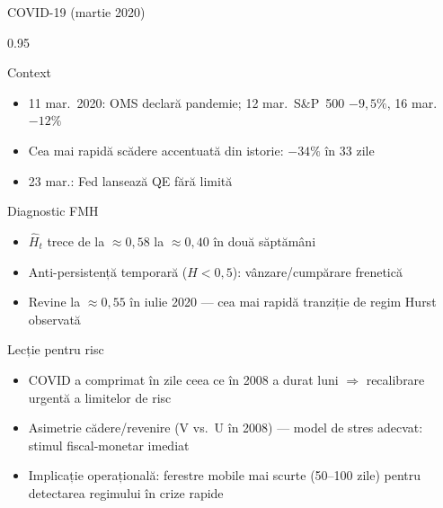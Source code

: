 \documentclass[9pt, aspectratio=169, t]{beamer}
\begin{document}
\begin{frame}[shrink=15]{COVID-19 (martie 2020)}
\begin{cminipage}{0.95\textwidth}
\begin{block}{Context}
\begin{itemize}\setlength{\itemsep}{0pt}
    \item 11 mar.\ 2020: OMS declară pandemie; 12 mar.\ S\&P~500 $-9{,}5\%$, 16 mar.\ $-12\%$
    \item Cea mai rapidă scădere accentuată din istorie: $-34\%$ în 33 zile
    \item 23 mar.: Fed lansează QE fără limită
\end{itemize}
\end{block}
\begin{alertblock}{Diagnostic FMH}
\begin{itemize}\setlength{\itemsep}{0pt}
    \item $\hat H_t$ trece de la $\approx 0{,}58$ la $\approx 0{,}40$ în două săptămâni
    \item Anti-persistență temporară ($H<0{,}5$): vânzare/cumpărare frenetică
    \item Revine la $\approx 0{,}55$ în iulie 2020 --- cea mai rapidă tranziție de regim Hurst observată
\end{itemize}
\end{alertblock}
\begin{exampleblock}{Lecție pentru risc}
\begin{itemize}\setlength{\itemsep}{0pt}
    \item COVID a comprimat în zile ceea ce în 2008 a durat luni $\Rightarrow$ recalibrare urgentă a limitelor de risc
    \item Asimetrie cădere/revenire (V vs.\ U în 2008) --- model de stres adecvat: stimul fiscal-monetar imediat
    \item Implicație operațională: ferestre mobile mai scurte (50--100 zile) pentru detectarea regimului în crize rapide
\end{itemize}
\end{exampleblock}
\end{cminipage}
\end{frame}
\end{document}
